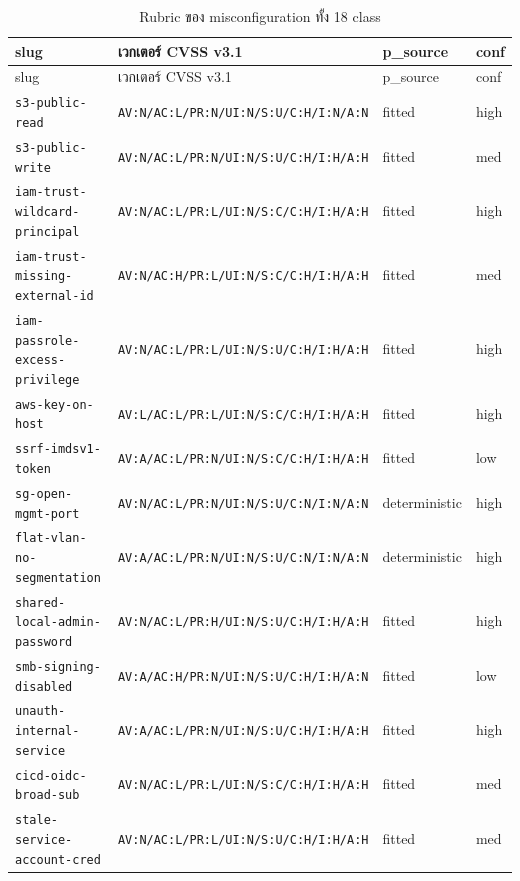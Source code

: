 \begin{longtable}{llll}
\caption{Rubric ของ misconfiguration ทั้ง 18 class}\label{tab:rubric-full} \\
\toprule
slug & เวกเตอร์ CVSS v3.1 & p\_source & conf \\
\midrule
\endfirsthead
\toprule
slug & เวกเตอร์ CVSS v3.1 & p\_source & conf \\
\midrule
\endhead
\texttt{\scriptsize s3-public-read} & \texttt{\scriptsize AV:N/AC:L/PR:N/UI:N/S:U/C:H/I:N/A:N} & fitted & high \\
\texttt{\scriptsize s3-public-write} & \texttt{\scriptsize AV:N/AC:L/PR:N/UI:N/S:U/C:H/I:H/A:H} & fitted & med \\
\texttt{\scriptsize iam-trust-wildcard-principal} & \texttt{\scriptsize AV:N/AC:L/PR:L/UI:N/S:C/C:H/I:H/A:H} & fitted & high \\
\texttt{\scriptsize iam-trust-missing-external-id} & \texttt{\scriptsize AV:N/AC:H/PR:L/UI:N/S:C/C:H/I:H/A:H} & fitted & med \\
\texttt{\scriptsize iam-passrole-excess-privilege} & \texttt{\scriptsize AV:N/AC:L/PR:L/UI:N/S:U/C:H/I:H/A:H} & fitted & high \\
\texttt{\scriptsize aws-key-on-host} & \texttt{\scriptsize AV:L/AC:L/PR:L/UI:N/S:C/C:H/I:H/A:H} & fitted & high \\
\texttt{\scriptsize ssrf-imdsv1-token} & \texttt{\scriptsize AV:A/AC:L/PR:N/UI:N/S:C/C:H/I:H/A:H} & fitted & low \\
\texttt{\scriptsize sg-open-mgmt-port} & \texttt{\scriptsize AV:N/AC:L/PR:N/UI:N/S:U/C:N/I:N/A:N} & deterministic & high \\
\texttt{\scriptsize flat-vlan-no-segmentation} & \texttt{\scriptsize AV:A/AC:L/PR:N/UI:N/S:U/C:N/I:N/A:N} & deterministic & high \\
\texttt{\scriptsize shared-local-admin-password} & \texttt{\scriptsize AV:N/AC:L/PR:H/UI:N/S:U/C:H/I:H/A:H} & fitted & high \\
\texttt{\scriptsize smb-signing-disabled} & \texttt{\scriptsize AV:A/AC:H/PR:N/UI:N/S:U/C:H/I:H/A:N} & fitted & low \\
\texttt{\scriptsize unauth-internal-service} & \texttt{\scriptsize AV:A/AC:L/PR:N/UI:N/S:U/C:H/I:H/A:H} & fitted & high \\
\texttt{\scriptsize cicd-oidc-broad-sub} & \texttt{\scriptsize AV:N/AC:L/PR:L/UI:N/S:C/C:H/I:H/A:H} & fitted & med \\
\texttt{\scriptsize stale-service-account-cred} & \texttt{\scriptsize AV:N/AC:L/PR:L/UI:N/S:U/C:H/I:H/A:H} & fitted & med \\

\end{longtable}
